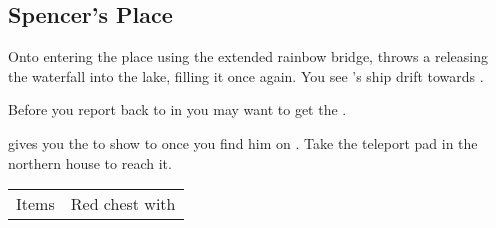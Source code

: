 \subsection{Spencer's Place}
\label{map:spencers_place}

Onto entering the place using the extended rainbow bridge,  throws a  releasing the waterfall into the lake, filling it once again. You see 's ship drift towards . 

Before you report back to  in  you may want to get the .

 gives you the  to show to  once you find him on . Take the teleport pad in the northern house to reach it.


\noindent\begin{tabularx}{\textwidth}[l]{lX}
	Items
	& Red chest with \nameref{item:mobius_crest}
\end{tabularx}
